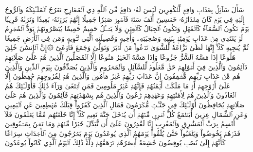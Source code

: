 سَأَلَ سَآئِلُۢ بِعَذَابٖ وَاقِعٖ
لِّلۡكَٰفِرِينَ لَيۡسَ لَهُۥ دَافِعٞ
مِّنَ ٱللَّهِ ذِي ٱلۡمَعَارِجِ
تَعۡرُجُ ٱلۡمَلَـٰٓئِكَةُ وَٱلرُّوحُ إِلَيۡهِ فِي يَوۡمٖ كَانَ مِقۡدَارُهُۥ خَمۡسِينَ أَلۡفَ سَنَةٖ
فَٱصۡبِرۡ صَبۡرٗا جَمِيلًا
إِنَّهُمۡ يَرَوۡنَهُۥ بَعِيدٗا
وَنَرَىٰهُ قَرِيبٗا
يَوۡمَ تَكُونُ ٱلسَّمَآءُ كَٱلۡمُهۡلِ
وَتَكُونُ ٱلۡجِبَالُ كَٱلۡعِهۡنِ
وَلَا يَسۡـَٔلُ حَمِيمٌ حَمِيمٗا
يُبَصَّرُونَهُمۡۚ يَوَدُّ ٱلۡمُجۡرِمُ لَوۡ يَفۡتَدِي مِنۡ عَذَابِ يَوۡمِئِذِۭ بِبَنِيهِ
وَصَٰحِبَتِهِۦ وَأَخِيهِ
وَفَصِيلَتِهِ ٱلَّتِي تُـٔۡوِيهِ
وَمَن فِي ٱلۡأَرۡضِ جَمِيعٗا ثُمَّ يُنجِيهِ
كَلَّآۖ إِنَّهَا لَظَىٰ
نَزَّاعَةٗ لِّلشَّوَىٰ
تَدۡعُواْ مَنۡ أَدۡبَرَ وَتَوَلَّىٰ
وَجَمَعَ فَأَوۡعَىٰٓ
۞إِنَّ ٱلۡإِنسَٰنَ خُلِقَ هَلُوعًا
إِذَا مَسَّهُ ٱلشَّرُّ جَزُوعٗا
وَإِذَا مَسَّهُ ٱلۡخَيۡرُ مَنُوعًا
إِلَّا ٱلۡمُصَلِّينَ
ٱلَّذِينَ هُمۡ عَلَىٰ صَلَاتِهِمۡ دَآئِمُونَ
وَٱلَّذِينَ فِيٓ أَمۡوَٰلِهِمۡ حَقّٞ مَّعۡلُومٞ
لِّلسَّآئِلِ وَٱلۡمَحۡرُومِ
وَٱلَّذِينَ يُصَدِّقُونَ بِيَوۡمِ ٱلدِّينِ
وَٱلَّذِينَ هُم مِّنۡ عَذَابِ رَبِّهِم مُّشۡفِقُونَ
إِنَّ عَذَابَ رَبِّهِمۡ غَيۡرُ مَأۡمُونٖ
وَٱلَّذِينَ هُمۡ لِفُرُوجِهِمۡ حَٰفِظُونَ
إِلَّا عَلَىٰٓ أَزۡوَٰجِهِمۡ أَوۡ مَا مَلَكَتۡ أَيۡمَٰنُهُمۡ فَإِنَّهُمۡ غَيۡرُ مَلُومِينَ
فَمَنِ ٱبۡتَغَىٰ وَرَآءَ ذَٰلِكَ فَأُوْلَـٰٓئِكَ هُمُ ٱلۡعَادُونَ
وَٱلَّذِينَ هُمۡ لِأَمَٰنَٰتِهِمۡ وَعَهۡدِهِمۡ رَٰعُونَ
وَٱلَّذِينَ هُم بِشَهَٰدَٰتِهِمۡ قَآئِمُونَ
وَٱلَّذِينَ هُمۡ عَلَىٰ صَلَاتِهِمۡ يُحَافِظُونَ
أُوْلَـٰٓئِكَ فِي جَنَّـٰتٖ مُّكۡرَمُونَ
فَمَالِ ٱلَّذِينَ كَفَرُواْ قِبَلَكَ مُهۡطِعِينَ
عَنِ ٱلۡيَمِينِ وَعَنِ ٱلشِّمَالِ عِزِينَ
أَيَطۡمَعُ كُلُّ ٱمۡرِيٕٖ مِّنۡهُمۡ أَن يُدۡخَلَ جَنَّةَ نَعِيمٖ
كَلَّآۖ إِنَّا خَلَقۡنَٰهُم مِّمَّا يَعۡلَمُونَ
فَلَآ أُقۡسِمُ بِرَبِّ ٱلۡمَشَٰرِقِ وَٱلۡمَغَٰرِبِ إِنَّا لَقَٰدِرُونَ
عَلَىٰٓ أَن نُّبَدِّلَ خَيۡرٗا مِّنۡهُمۡ وَمَا نَحۡنُ بِمَسۡبُوقِينَ
فَذَرۡهُمۡ يَخُوضُواْ وَيَلۡعَبُواْ حَتَّىٰ يُلَٰقُواْ يَوۡمَهُمُ ٱلَّذِي يُوعَدُونَ
يَوۡمَ يَخۡرُجُونَ مِنَ ٱلۡأَجۡدَاثِ سِرَاعٗا كَأَنَّهُمۡ إِلَىٰ نُصُبٖ يُوفِضُونَ
خَٰشِعَةً أَبۡصَٰرُهُمۡ تَرۡهَقُهُمۡ ذِلَّةٞۚ ذَٰلِكَ ٱلۡيَوۡمُ ٱلَّذِي كَانُواْ يُوعَدُونَ